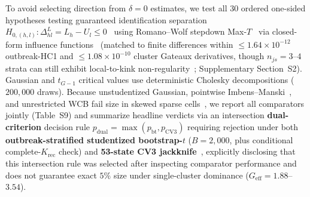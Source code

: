To avoid selecting direction from $\delta=0$ estimates, we test all $30$ ordered one-sided hypotheses testing guaranteed identification separation $H_{0,(h,l)}: \Delta^L_{hl} = L_h - U_l \le 0$~\cite{andrews2024inference} using Romano--Wolf stepdown Max-$T$~\cite{romano2005exact} via closed-form influence functions~\cite{stefanski2002calculus} (matched to finite differences within $\le 1.64 \times 10^{-12}$ outbreak-HC1 and $\le 1.08 \times 10^{-10}$ cluster Gateaux derivatives, though $n_{js}=3$--$4$ strata can still exhibit local-to-kink non-regularity~\cite{fang2019inference}; Supplementary Section~S2). Gaussian and $t_{G-1}$ critical values use deterministic Cholesky decompositions ($200{,}000$ draws). Because unstudentized Gaussian, pointwise Imbens--Manski~\cite{imbens2004confidence}, and unrestricted WCB fail size in skewed sparse cells~\cite{stoye2009more,cameron2008bootstrap,mackinnon2017wild,canay2021wild,mackinnon2023cluster}, we report all comparators jointly (Table~S9) and summarize headline verdicts via an intersection \textbf{dual-criterion} decision rule $p_{\text{dual}} = \max(p_{\text{bt}}, p_{\text{CV3}})$ requiring rejection under both \textbf{outbreak-stratified studentized bootstrap-$t$} ($B = 2,000$, plus conditional complete-$K_{\text{rec}}$ check) and \textbf{53-state CV3 jackknife}~\cite{mackinnon2023cluster}, explicitly disclosing that this intersection rule was selected after inspecting comparator performance and does not guarantee exact $5\%$ size under single-cluster dominance ($G_{\text{eff}} = 1.88$--$3.54$).

